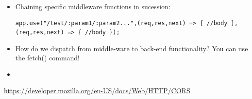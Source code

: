 \documentclass[8pt,a4paper]{extarticle}
\begin{document}
\begin{itemize}
\item Chaining specific middleware functions in sucession:

\begin{verbatim}
app.use("/test/:param1/:param2...",(req,res,next) => { //body },(req,res,next) => { //body });
\end{verbatim}
\item How do we dispatch from middle-ware to back-end functionality? You can use the fetch() command!
\item 

\end{itemize}


\begin{thebibliography}{9}

\url{https://developer.mozilla.org/en-US/docs/Web/HTTP/CORS}	
\end{thebibliography}
\end{document}
